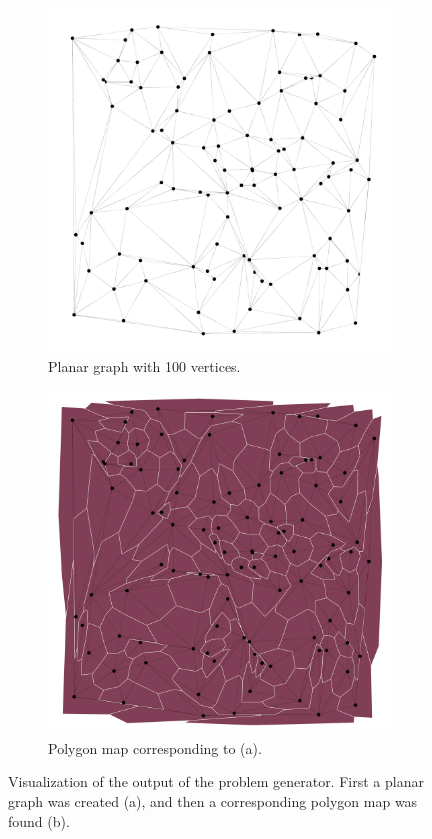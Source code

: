 \documentclass{article}
\begin{document}
	\begin{figure}[h!]
		\centering
		\begin{subfigure}{0.45\textwidth}
			\centering
			\includegraphics[width=\textwidth]{images/pgen}
			\caption{Planar graph with 100 vertices.}
			\label{pgen}
		\end{subfigure}
		\qquad
		\begin{subfigure}{0.45\textwidth}
			\centering
				\includegraphics[width=\textwidth]{images/pgen_poly}
				\caption{Polygon map corresponding to (a).}
				\label{pgen_poly}
		\end{subfigure}
		\caption{Visualization of the output of the problem generator. First a planar graph was created (a), and then a corresponding polygon map was found (b).}
	\end{figure}
	
\end{document}

